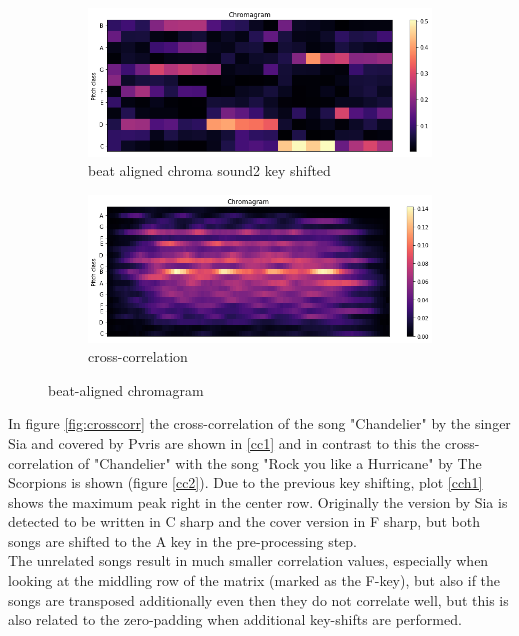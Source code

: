 \begin{figure}[htbp]
{{			\begin{subfigure}{.495\textwidth}
				\centering     
				\includegraphics[scale=0.3]{Images/Chroma/beatalignedchroma2_ks.png}
				\caption{beat aligned chroma sound2 key shifted}
				\label{cks2}
			\end{subfigure}%
			\begin{subfigure}{.495\textwidth}
				\centering     
				\includegraphics[scale=0.3]{Images/Chroma/beatalignedchroma_corr.png}
				\caption{cross-correlation}
				\label{c2}
			\end{subfigure}%
	}}
	\caption{beat-aligned chromagram}
	\label{fig:beatalign}
\end{figure}
In figure \ref{fig:crosscorr} the cross-correlation of the song "Chandelier" by the singer Sia and covered by Pvris are shown in \ref{cc1} and in contrast to this the cross-correlation of "Chandelier" with the song "Rock you like a Hurricane" by The Scorpions is shown (figure \ref{cc2}). Due to the previous key shifting, plot \ref{cch1} shows the maximum peak right in the center row. Originally the version by Sia is detected to be written in C sharp and the cover version in F sharp, but both songs are shifted to the A key in the pre-processing step.\\
The unrelated songs result in much smaller correlation values, especially when looking at the middling row of the matrix (marked as the F-key), but also if the songs are transposed additionally even then they do not correlate well, but this is also related to the zero-padding when additional key-shifts are performed. 
